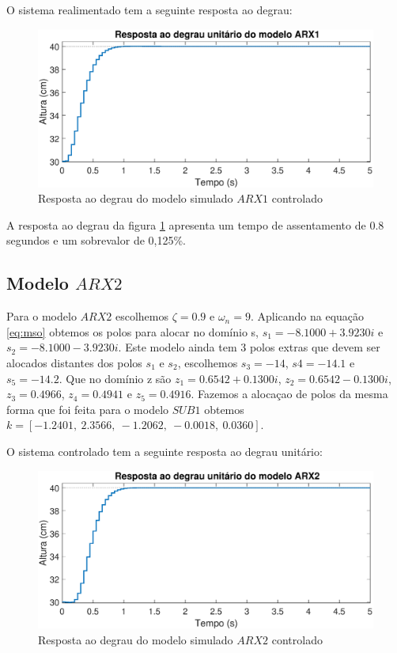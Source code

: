 O sistema realimentado tem a seguinte resposta ao degrau:

\begin{figure}[H]
	\centering
	\includegraphics[width=1\linewidth]{respostadegrauarx1c}
	\caption[Resposta ao degrau do modelo simulado $ARX1$ controlado]{Resposta ao degrau do modelo simulado $ARX1$ controlado}
	\label{fig:respostadegrauarx1c}
\end{figure}


A resposta ao degrau da figura \ref{fig:respostadegrauarx1c} apresenta um tempo de assentamento de 0.8 segundos e um sobrevalor de 0,125\%.

\subsection{Modelo $ARX2$}
Para o modelo $ARX2$ escolhemos $\zeta=0.9$ e $\omega_n=9$. Aplicando na equação \eqref{eq:mso} obtemos os polos para alocar no domínio s, $s_1=-8.1000 + 3.9230i$ e $s_2=-8.1000 - 3.9230i$. Este modelo ainda tem 3 polos extras que devem ser alocados distantes dos polos $s_1$ e $s_2$, escolhemos $s_3=-14$, $s4=-14.1$ e $s_5=-14.2$. Que no domínio z são $z_1=0.6542 + 0.1300i$, $z_2=0.6542 - 0.1300i$, $z_3=0.4966$, $z_4=0.4941$ e $z_5=0.4916$. Fazemos a alocaçao de polos da mesma forma que foi feita para o modelo $SUB1$ obtemos $k=[-1.2401,~2.3566,~-1.2062,~-0.0018,~0.0360]$.

O sistema controlado tem a seguinte resposta ao degrau unitário:

\begin{figure}[H]
	\centering
	\includegraphics[width=1\linewidth]{respostadegrauarx2c}
	\caption[Resposta ao degrau do modelo $ARX2$]{Resposta ao degrau do modelo simulado $ARX2$ controlado}
	\label{fig:respostadegrauarx2c}
\end{figure}

